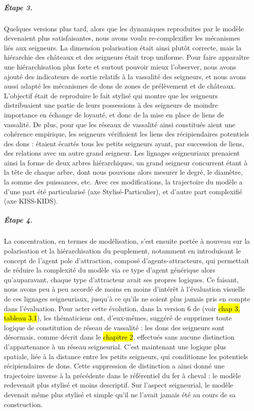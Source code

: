 \subparagraph{Étape 3.}Quelques versions plus tard, alors que les dynamiques reproduites par le modèle devenaient plus satisfaisantes, nous avons voulu re-complexifier les mécanismes liés aux seigneurs.
La dimension polarisation était ainsi plutôt correcte, mais la hiérarchie des châteaux et des seigneurs était trop uniforme.
Pour faire apparaître une hiérarchisation plus forte et surtout pouvoir mieux l'observer, nous avons ajouté des indicateurs de sortie relatifs à la vassalité des seigneurs, et nous avons aussi adapté les mécanismes de dons de zones de prélèvement et de châteaux.
L'objectif était de reproduire le fait stylisé qui montre que les seigneurs distribuaient une partie de leurs possessions à des seigneurs de moindre importance en échange de loyauté, et donc de la mise en place de liens de vassalité.
De plus, pour que les réseaux de vassalité ainsi constitués aient une cohérence empirique, les seigneurs vérifiaient les liens des récipiendaires potentiels des dons : étaient écartés tous les petits seigneurs ayant, par succession de liens, des relations avec un autre grand seigneur.
Les lignages seigneuriaux prenaient ainsi la forme de deux arbres hiérarchiques, un grand seigneur concurrent étant à la tête de chaque arbre, dont nous pouvions alors mesurer le degré, le diamètre, la somme des puissances, etc.
Avec ces modifications, la trajectoire du modèle a d'une part été particularisé (axe Stylisé-Particulier), et d'autre part complexifié (axe KISS-KIDS).

\subparagraph{Étape 4.}La concentration, en termes de modélisation, s'est ensuite portée à nouveau sur la polarisation et la hiérarchisation du peuplement, notamment en introduisant le concept de l'agent \og pole d'attraction\fg{}, composé d'agents-attracteurs, qui permettait de réduire la complexité du modèle via ce type d'agent générique alors qu'auparavant, chaque type d'attracteur avait ses propres logiques.
Ce faisant, nous avons peu à peu accordé de moins en moins d'intérêt à l'évaluation visuelle de ces lignages seigneuriaux, jusqu'à ce qu'ils ne soient plus jamais pris en compte dans l'évaluation.
Pour acter cette évolution, dans la version 6 de \simfeodal{} (voir \hl{chap 3, tableau 3.1}), les thématiciens ont, d'eux-mêmes, suggéré de supprimer toute logique de constitution de réseau de vassalité : les dons des seigneurs sont désormais, comme décrit dans le \hl{chapitre 2}, effectués sans aucune distinction d'appartenance à un réseau seigneurial.
C'est maintenant une logique plus spatiale, liée à la distance entre les petits seigneurs, qui conditionne les potentiels récipiendaires de dons.
Cette suppression de distinction a ainsi donné une trajectoire inverse à la précédente dans le référentiel du fer à cheval : le modèle redevenait plus stylisé et moins descriptif.
Sur l'aspect seigneurial, le modèle devenait même plus stylisé et simple qu'il ne l'avait jamais été au cours de sa construction.


